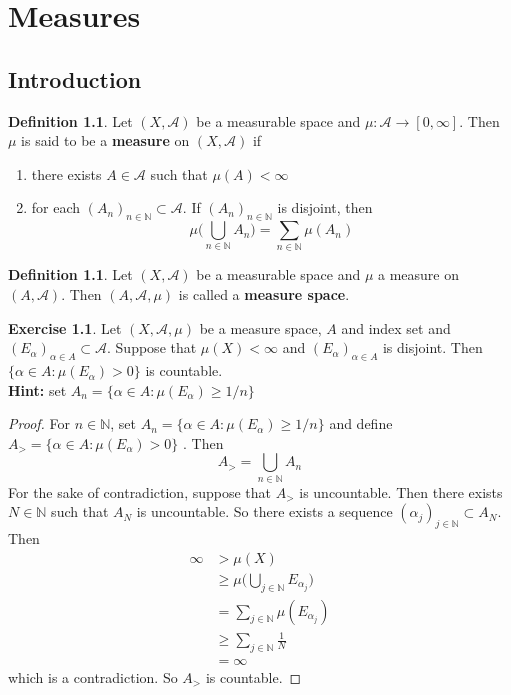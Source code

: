 \documentclass{book}
\theoremstyle{definition}
\newtheorem{defn}[definition]{Definition}
\newtheorem{ex}[definition]{Exercise}
\newcommand{\al}{\alpha}
\newcommand{\N}{\mathbb{N}}
\newcommand{\MA}{\mathcal{A}}
\newcommand{\lex}[1]{\label{ex:#1}}
\newcommand{\ld}[1]{\label{defn:#1}}
\DeclareMathOperator*{\0}{\mbf{0}}
\DeclareMathOperator*{\1}{\mbf{1}}
\newcommand{\RG}{[0,\infty]}
\begin{document}
	
	
	
	
	
	
	
	
	
	
	
	
	
	
	
	
	
	
	
	
	
	\newpage
	\chapter{Measures}
	
	\section{Introduction}
	
	\begin{defn} \ld{00000} 
		Let $(X, \MA)$ be a measurable space and $\mu:\MA \rightarrow \RG$. Then $\mu$ is said to be a \textbf{measure} on $(X, \MA)$ if 
		\begin{enumerate}
			\item there exists $A \in \MA$ such that $\mu(A)< \infty$
			\item for each $(A_n)_{n \in \N} \subset \MA$. If $(A_n)_{n \in \N}$ is disjoint, then $$\mu\bigg(\bigcup_{n \in \N}A_n \bigg) = \sum_{n \in \N}\mu(A_n)$$
		\end{enumerate}
	\end{defn}
	
	\begin{defn} \ld{00000} 
		Let $(X,\MA)$ be a measurable space and $\mu$ a measure on $(A, \MA)$. Then $(A, \MA, \mu)$ is called a \textbf{measure space}. 
	\end{defn}
	
	\begin{ex} \lex{00000} 
	Let $(X, \MA, \mu)$ be a measure space, $A$ and index set and $(E_{\al})_{\al \in A} \subset \MA$. Suppose that $\mu(X) < \infty$ and $(E_\al)_{\al \in A }$ is disjoint. Then $\{\al \in A: \mu(E_{\al}) >0\}$ is countable.\\
	\textbf{Hint:} set $A_n = \{\al \in A: \mu(E_{\al}) \geq 1/n \}$ 
	\end{ex}
	
	\begin{proof}
	For $n \in \N$, set $A_n = \{\al \in A: \mu(E_{\al}) \geq 1/n \}$ and define $ A_> = \{\al \in A: \mu(E_{\al}) >0\}$ . Then 
	$$A_> = \bigcup_{n \in \N}A_n$$
	For the sake of contradiction, suppose that 
	$A_>$ is uncountable. Then there exists $N \in \N$ such that $A_N$ is uncountable. So there exists a sequence $(\al_j)_{j \in \N} \subset A_N$. Then 
	\begin{align*}
	\infty 
	& > \mu(X) \\
	& \geq \mu \bigg( \bigcup_{j \in \N} E_{\al_{j}} \bigg) \\
	&= \sum_{j \in \N} \mu(E_{\al_j}) \\
	& \geq \sum_{j \in \N} \frac{1}{N} \\
	&= \infty
	\end{align*} 
	which is a contradiction. So $A_>$ is countable.
	\end{proof}
	
\end{document}
